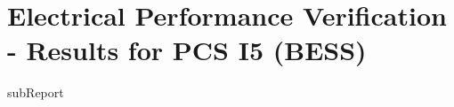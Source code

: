 \renewcommand{\DTRPcs}{I5PPM} %
\renewcommand{\DTRPcsLong}{I5 (BESS)}


    \section{Electrical Performance Verification - Results for PCS \DTRPcsLong}

    {{subReport}}
    \newpage

